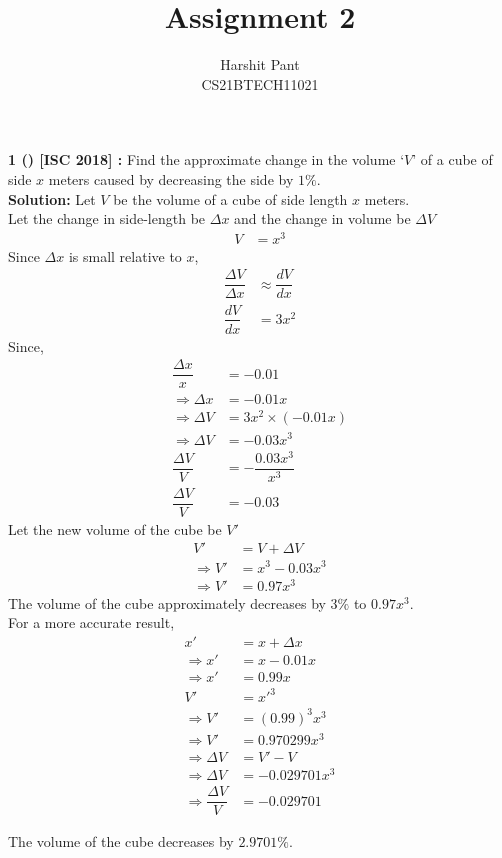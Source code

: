\documentclass[journal,12pt,twocolumn]{IEEEtran}
\title{Assignment 2}
\author{Harshit Pant\\CS21BTECH11021}
\date{}
\begin{document}
\maketitle
\textbf{1 () [ISC 2018] :}
Find the approximate change in the volume `$V$' of a cube of side $x$ meters caused by decreasing the side by $1\%$.\\

\textbf{Solution:} Let $V$ be the volume of a cube of side length $x$ meters.\\
Let the change in side-length be $\Delta x$ and the change in volume be $\Delta V$
\begin{align}
V&=x^3
\end{align}
Since $\Delta x$ is small relative to $x$,
\addtolength{\jot}{.1in}
\begin{align}
\dfrac{\Delta V}{\Delta x}&\approx\dfrac{dV}{dx}\\
\dfrac{dV}{dx}&=3x^2
\end{align}
Since,
\begin{align}
\dfrac{\Delta x}{x}&=-0.01\\
\Rightarrow\Delta x&=-0.01x\\
\Rightarrow\Delta V&=3x^2\times(-0.01x)\\
\Rightarrow\Delta V&=-0.03x^3\\
\dfrac{\Delta V}{V}&=-\dfrac{0.03x^3}{x^3}\\
\dfrac{\Delta V}{V}&=-0.03
\end{align}
Let the new volume of the cube be $V'$
\begin{align}
V'&=V+\Delta V\\
\Rightarrow V'&=x^3-0.03x^3\\
\Rightarrow V'&=0.97x^3
\end{align}
The volume of the cube approximately decreases by $3\%$  to $0.97x^3$.\\

For a more accurate result,
\begin{align}
x'&=x+\Delta x\\
\Rightarrow x'&=x-0.01x\\
\Rightarrow x'&=0.99x\\
V'&={x'}^3\\
\Rightarrow V'&=(0.99)^3x^3\\
\Rightarrow V'&=0.970299x^3\\
\Rightarrow \Delta V&=V'-V\\
\Rightarrow \Delta V&=-0.029701x^3\\
\Rightarrow \dfrac{\Delta V}{V}&=-0.029701
\end{align}

The volume of the cube decreases by $2.9701\%$.
\end{document}
